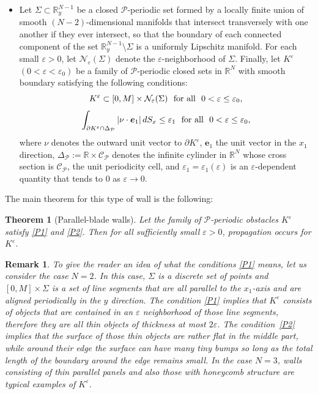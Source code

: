 \documentclass[a4paper,12pt,fullpage]{article}
\numberwithin{equation}{section}
\newtheorem{Thm}{Theorem}
\newtheorem{Rk}[Lemma]{Remark}
\def\R{{\mathbb R}}
\def\ep{\varepsilon}
\begin{document}
\begin{itemize}
\item[(P)] Let $\Sigma\subset\R^{N-1}_y$ be a closed ${\mathcal P}$-periodic set formed by a locally finite union of smooth $(N-2)$-dimensional manifolds that intersect transversely with one another if they ever intersect, so that the boundary of each connected component of the set $\R^{N-1}_y\setminus \Sigma$ is a uniformly Lipschitz manifold.  For each small $\ep>0$, let ${\mathcal N}_\ep(\Sigma)$ denote the $\ep$-neighborhood of $\Sigma$. Finally, let $K^\ep$ $(0<\ep<\ep_0)$ be a family of ${\mathcal P}$-periodic closed sets in $\R^N$ with smooth boundary satisfying the following conditions:
\begin{equation}\label{P1}
K^\ep\subset [0,M]\times {\mathcal N}_\ep(\Sigma) \ \ \hbox{for all}\ \ 0<\ep\leq \ep_0, 
\end{equation}
\begin{equation}\label{P2}
\int_{\partial K^\ep\cap \Delta_{\mathcal P}} |\nu\cdot {\boldsymbol e}_1| \,dS_x\leq \ep_1  \ \ \hbox{for all}\ \ 0<\ep\leq \ep_0, 
\end{equation}
where $\nu$ denotes the outward unit vector to $\partial K^\ep$, $ {\boldsymbol e}_1$ the unit vector in the $x_1$ direction, $\Delta_{\mathcal P}:=\R\times {\mathcal C}_{\mathcal P}$ denotes the infinite cylinder in $\R^N$ whose cross section is ${\mathcal C}_{\mathcal P}$, the unit periodicity cell, 
and $\ep_1=\ep_1(\ep)$ is an $\ep$-dependent quantity that tends to $0$ as $\ep\to 0$.
\end{itemize}

The main theorem for this type of wall is the following:

\begin{Thm}[Parallel-blade walls]\label{th:parallel}
Let the family of ${\mathcal P}$-periodic obstacles $K^\ep$ satisfy \eqref{P1} and \eqref{P2}. Then for all sufficiently small $\ep>0$, propagation occurs for $K^\ep$.
\end{Thm}

\begin{Rk}\label{rk:blade}
To give the reader an idea of what the conditions \eqref{P1} means, let us consider the case $N=2$.  In this case, $\Sigma$ is a discrete set of points and $[0,M]\times\Sigma$ is a set of line segments that are all parallel to the $x_1$-axis and are aligned periodically in the $y$ direction.  The condition \eqref{P1} implies that $K^\ep$ consists of objects that are contained in an $\ep$ neighborhood of those line segments, therefore they are all thin objects of thickness at most $2\ep$. The condition~\eqref{P2} implies that the surface of those thin objects are rather flat in the middle part, while around  their edge the surface can have many tiny bumps so long as the total  length of the boundary around the edge remains small. In the case $N=3$, walls consisting of thin parallel panels and also those with honeycomb structure are typical examples of $K^\ep$.  
\end{Rk}
\end{document}

